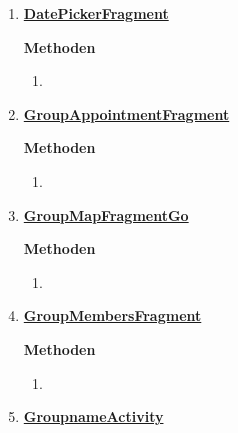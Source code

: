 \begin{enumerate}
	\item \textbf{\underline{DatePickerFragment}}
	
	
	\textbf{Methoden}
	\begin{enumerate}
		\item 
		
	\end{enumerate}
	
	\item \textbf{\underline{GroupAppointmentFragment}}
	
	\textbf{Methoden}
	\begin{enumerate}
		\item 
		
	\end{enumerate}

	\item \textbf{\underline{GroupMapFragmentGo}}

	
	\textbf{Methoden}
	\begin{enumerate}
		\item 
		
	\end{enumerate}

	\item \textbf{\underline{GroupMembersFragment}}
	
	
	\textbf{Methoden}
	\begin{enumerate}
		\item 
		
	\end{enumerate}

	\item \textbf{\underline{GroupnameActivity}}
	
	

\end{enumerate}
